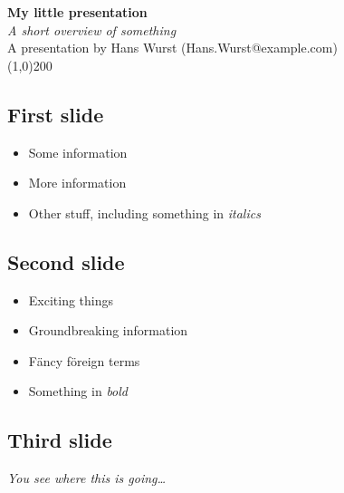 \documentclass[pdftex,a4paper,12pt]{report}
\begin{document}
\begin{center}
    \large\textbf{My little presentation}\\
    \emph{A short overview of something}\\[0.5cm]
    \normalsize A presentation by Hans Wurst (Hans.Wurst@example.com)\\
  \line(1,0){200}\\[0.5cm] 
\end{center}

\subsection*{First slide}

\begin{itemize}
\item
  Some information
\item
  More information
\item
  Other stuff, including something in \emph{italics}
\end{itemize}

\subsection*{Second slide}

\begin{itemize}
\item
  Exciting things
\item
  Groundbreaking information
\item
  F\"{a}ncy f\"{o}reign terms
\item
  Something in \emph{bold}
\end{itemize}

\subsection*{Third slide}

\emph{You see where this is going\ldots{}}
\end{document}
